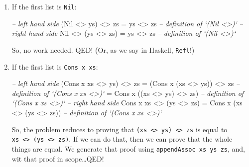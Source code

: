 \documentclass[]{article}
\newenvironment{Shaded}{\begin{snugshade}}{\end{snugshade}}
\newcommand{\CommentTok}[1]{\textcolor[rgb]{0.56,0.35,0.01}{\textit{#1}}}
\newcommand{\DataTypeTok}[1]{\textcolor[rgb]{0.13,0.29,0.53}{#1}}
\newcommand{\FunctionTok}[1]{\textcolor[rgb]{0.00,0.00,0.00}{#1}}
\newcommand{\NormalTok}[1]{#1}
\begin{document}
\begin{enumerate}
\def\labelenumi{\arabic{enumi}.}
\item
  If the first list is \texttt{Nil}:

\begin{Shaded}
\begin{Highlighting}[]
\CommentTok{-- left hand side}
\NormalTok{(}\DataTypeTok{Nil} \FunctionTok{<>}\NormalTok{ ys) }\FunctionTok{<>}\NormalTok{ zs}
  \FunctionTok{=}\NormalTok{ ys }\FunctionTok{<>}\NormalTok{ zs        }\CommentTok{-- definition of `(Nil <>)`}
\CommentTok{-- right hand side}
\DataTypeTok{Nil} \FunctionTok{<>}\NormalTok{ (ys }\FunctionTok{<>}\NormalTok{ zs)}
  \FunctionTok{=}\NormalTok{ ys }\FunctionTok{<>}\NormalTok{ zs        }\CommentTok{-- definition of `(Nil <>)`}
\end{Highlighting}
\end{Shaded}

  So, no work needed. QED! (Or, as we say in Haskell, \texttt{Refl}!)
\item
  If the first list is \texttt{Cons\ x\ xs}:

\begin{Shaded}
\begin{Highlighting}[]
\CommentTok{-- left hand side}
\NormalTok{(}\DataTypeTok{Cons}\NormalTok{ x xs }\FunctionTok{<>}\NormalTok{ ys) }\FunctionTok{<>}\NormalTok{ zs}
  \FunctionTok{=}\NormalTok{ (}\DataTypeTok{Cons}\NormalTok{ x (xs }\FunctionTok{<>}\NormalTok{ ys)) }\FunctionTok{<>}\NormalTok{ zs   }\CommentTok{-- definition of `(Cons x xs <>)`}
  \FunctionTok{=} \DataTypeTok{Cons}\NormalTok{ x ((xs }\FunctionTok{<>}\NormalTok{ ys) }\FunctionTok{<>}\NormalTok{ zs)   }\CommentTok{-- definition of `(Cons x xs <>)`}
\CommentTok{-- right hand side}
\DataTypeTok{Cons}\NormalTok{ x xs }\FunctionTok{<>}\NormalTok{ (ys }\FunctionTok{<>}\NormalTok{ zs)}
  \FunctionTok{=} \DataTypeTok{Cons}\NormalTok{ x (xs }\FunctionTok{<>}\NormalTok{ (ys }\FunctionTok{<>}\NormalTok{ zs))   }\CommentTok{-- definition of `(Cons x xs <>)`}
\end{Highlighting}
\end{Shaded}

  So, the problem reduces to proving that
  \texttt{(xs\ \textless{}\textgreater{}\ ys)\ \textless{}\textgreater{}\ zs} is
  equal to
  \texttt{xs\ \textless{}\textgreater{}\ (ys\ \textless{}\textgreater{}\ zs)}.
  If we can do that, then we can prove that the whole things are equal. We
  generate that proof using \texttt{appendAssoc\ xs\ ys\ zs}, and, wit that
  proof in scope\ldots{}QED!
\end{enumerate}
\end{document}
